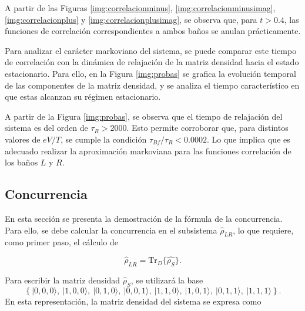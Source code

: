 \begin{appendixs}
A partir de las Figuras \ref{img:correlacionminus}, \ref{img:correlacionminusimag}, \ref{img:correlacionplus} y \ref{img:correlacionplusimag}, se observa que, para $t > 0.4$, las funciones de correlación correspondientes a ambos baños se anulan prácticamente. 

Para analizar el carácter markoviano del sistema, se puede comparar este tiempo de correlación con la dinámica de relajación de la matriz densidad hacia el estado estacionario. Para ello, en la Figura \ref{img:probas} se grafica la evolución temporal de las componentes de la matriz densidad, y se analiza el tiempo característico en que estas alcanzan su régimen estacionario.



A partir de la Figura \ref{img:probas}, se observa que el tiempo de relajación del sistema es del orden de $\tau_{R} > 2000$. Esto permite corroborar que, para distintos valores de $eV/T$, se cumple la condición $\tau_{Bf}/\tau_{R} < 0.0002$. Lo que implica que es adecuado realizar la aproximación markoviana para las funciones correlación de los baños $L$ y $R$.

\label{appendix5tauf}

\newpage 

\subsection{Concurrencia}
En esta sección se presenta la demostración de la fórmula de la concurrencia. Para ello, se debe calcular la concurrencia en el subsistema $\hat{\rho}_{LR}$, lo que requiere, como primer paso, el cálculo de

\begin{equation*}
    \hat{\rho}_{LR} = \text{Tr}_{D}\{ \hat{\rho_{S}} \}.
\end{equation*}

Para escribir la matriz densidad $\hat{\rho}_{S}$, se utilizará la base  
\[
\left\{ |0,0,0\rangle,\ |1,0,0\rangle,\ |0,1,0\rangle,\ |0,0,1\rangle,\ |1,1,0\rangle,\ |1,0,1\rangle,\ |0,1,1\rangle,\ |1,1,1\rangle \right\}.
\]
En esta representación, la matriz densidad del sistema se expresa como


\end{appendixs}
